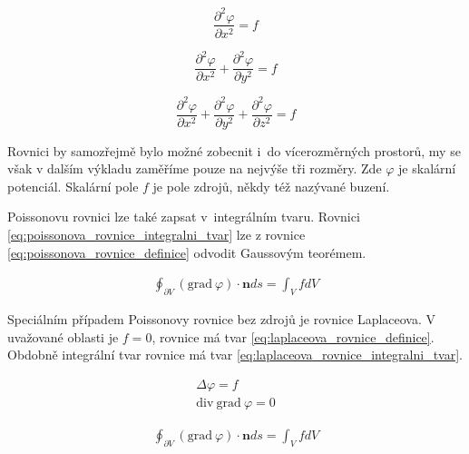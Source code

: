\documentclass{book}
\newcommand{\vect}[1]{\boldsymbol{#1}}
\newcommand{\grad}{\mathrm{grad}}
\newcommand{\diverg}{\mathrm{div}}
\begin{document}
\begin{equation}
\label{eq:poissonova_rovnice_primka}
\frac{\partial^2 \varphi}{\partial x^2} = f
\end{equation}

\begin{equation}
\label{eq:poissonova_rovnice_rovina}
\frac{\partial^2 \varphi}{\partial x^2} + \frac{\partial^2 \varphi}{\partial y^2} = f
\end{equation}

\begin{equation}
\label{eq:poissonova_rovnice_prostor}
\frac{\partial^2 \varphi}{\partial x^2} + \frac{\partial^2 \varphi}{\partial y^2} + \frac{\partial^2 \varphi}{\partial z^2} = f
\end{equation}

Rovnici by samozřejmě bylo možné zobecnit i~do vícerozměrných prostorů, my se však v dalším výkladu zaměříme pouze na nejvýše tři rozměry.
Zde \(\varphi\) je skalární potenciál. Skalární pole \(f\) je pole zdrojů, někdy též nazývané buzení.

Poissonovu rovnici lze také zapsat v~integrálním tvaru. Rovnici \eqref{eq:poissonova_rovnice_integralni_tvar} lze z rovnice \eqref{eq:poissonova_rovnice_definice} odvodit Gaussovým teorémem.

\begin{equation}
\label{eq:poissonova_rovnice_integralni_tvar}
\begin{split}
\oint_{\partial V} \left( \grad \ \varphi \right) \cdot \vect{n} ds = \int_V f dV
\end{split}
\end{equation}

Speciálním případem Poissonovy rovnice bez zdrojů je rovnice Laplaceova. V uvažované oblasti je \(f = 0\), rovnice má tvar \eqref{eq:laplaceova_rovnice_definice}. Obdobně integrální tvar rovnice má tvar \eqref{eq:laplaceova_rovnice_integralni_tvar}.

\begin{equation}
\label{eq:laplaceova_rovnice_definice}
\begin{split}
\Delta \varphi = f \\
\diverg \ \grad \ \varphi = 0
\end{split}
\end{equation}

\begin{equation}
\label{eq:laplaceova_rovnice_integralni_tvar}
\begin{split}
\oint_{\partial V} \left( \grad \ \varphi \right) \cdot \vect{n} ds = \int_V f dV
\end{split}
\end{equation}
\end{document}
